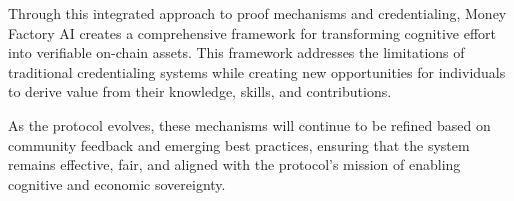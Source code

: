 Through this integrated approach to proof mechanisms and credentialing, Money Factory AI creates a comprehensive framework for transforming cognitive effort into verifiable on-chain assets. This framework addresses the limitations of traditional credentialing systems while creating new opportunities for individuals to derive value from their knowledge, skills, and contributions.

As the protocol evolves, these mechanisms will continue to be refined based on community feedback and emerging best practices, ensuring that the system remains effective, fair, and aligned with the protocol's mission of enabling cognitive and economic sovereignty.

\newpage
